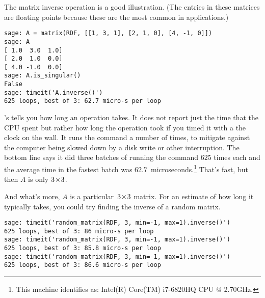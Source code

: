 The matrix inverse operation is a good illustration.
(The entries in these matrices are floating points 
because these are the most common in applications.)
\begin{lstlisting}
sage: A = matrix(RDF, [[1, 3, 1], [2, 1, 0], [4, -1, 0]])
sage: A
[ 1.0  3.0  1.0]
[ 2.0  1.0  0.0]
[ 4.0 -1.0  0.0]
sage: A.is_singular()
False
sage: timeit('A.inverse()')
625 loops, best of 3: 62.7 micro-s per loop
\end{lstlisting}
\Sage's  tells you how long
an operation takes.
It does not report just the time that the CPU
spent but rather how long the operation took if you timed
it with a the clock on the wall.
It runs the command 
a number of times, to mitigate against the
computer being slowed down by a 
disk write or other interruption.
The bottom line says it did three batches of running the command 
$625$ times each and the average time in the fastest batch
was $62.7$~microseconds.\footnote{%
  This machine 
  identifies as: Intel(R) Core(TM) i7-6820HQ CPU @ 2.70GHz.}
That's fast, but then $A$ is only $3 \! \times \! 3$.

And what's more, $A$ is a particular~$3 \! \times \! 3$ matrix. 
For an estimate of
how long it typically takes,
you could try finding the inverse of a random matrix.
\begin{lstlisting}
sage: timeit('random_matrix(RDF, 3, min=-1, max=1).inverse()')
625 loops, best of 3: 86 micro-s per loop
sage: timeit('random_matrix(RDF, 3, min=-1, max=1).inverse()')
625 loops, best of 3: 85.8 micro-s per loop
sage: timeit('random_matrix(RDF, 3, min=-1, max=1).inverse()')
625 loops, best of 3: 86.6 micro-s per loop
\end{lstlisting}


